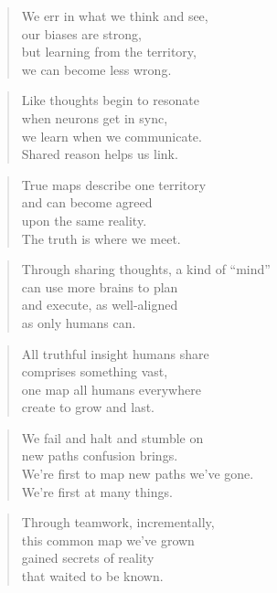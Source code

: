 \documentclass[10pt,a4paper]{article}
\begin{document}
\begin{multicols}{2}
\begin{verse}
We err in what we think and see,\\
our biases are strong,\\
but learning from the territory,\\
we can become less wrong.
\end{verse}

\begin{verse}
Like thoughts begin to resonate\\
when neurons get in sync,\\
we learn when we communicate.\\
Shared reason helps us link.
\end{verse}

\begin{verse}
True maps describe one territory\\
and can become agreed\\
upon the same reality.\\
The truth is where we meet.
\end{verse}

\begin{verse}
Through sharing thoughts, a kind of “mind”\\
can use more brains to plan\\
and execute, as well-aligned\\
as only humans can.
\end{verse}

\begin{verse}
All truthful insight humans share\\
comprises something vast,\\
one map all humans everywhere\\
create to grow and last.
\end{verse}

\begin{verse}
We fail and halt and stumble on\\
new paths confusion brings.\\
We’re first to map new paths we’ve gone.\\
We’re first at many things.
\end{verse}

\begin{verse}
Through teamwork, incrementally,\\
this common map we’ve grown\\
gained secrets of reality\\
that waited to be known.
\end{verse}


\end{multicols}
\end{document}
